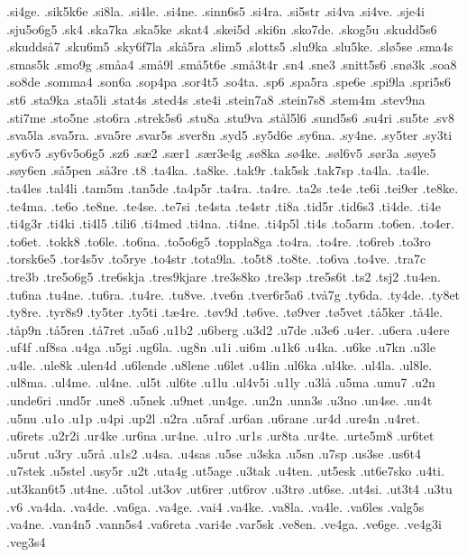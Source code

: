 {.si4ge.
.sik5k6e
.si8la.
.si4le.
.si4ne.
.sinn6s5
.si4ra.
.si5str
.si4va
.si4ve.
.sje4i
.sju5o6g5
.sk4
.ska7ka
.ska5ke
.skat4
.skei5d
.ski6n
.sko7de.
.skog5u
.skudd5s6
.skudds^^e57
.sku6m5
.sky6f7la
.sk^^e55ra
.slim5
.slotts5
.slu9ka
.slu5ke.
.sl^^f85se
.sma4s
.smas5k
.smo9g
.sm^^e5a4
.sm^^e59l
.sm^^e55t6e
.sm^^e53t4r
.sn4
.sne3
.snitt5s6
.sn^^f83k
.soa8
.so8de
.somma4
.son6a
.sop4pa
.sor4t5
.so4ta.
.sp6
.spa5ra
.spe6e
.spi9la
.spri5s6
.st6
.sta9ka
.sta5li
.stat4s
.sted4s
.ste4i
.stein7a8
.stein7s8
.stem4m
.stev9na
.sti7me
.sto5ne
.sto6ra
.strek5s6
.stu8a
.stu9va
.st^^e5l5l6
.sund5s6
.su4ri
.su5te
.sv8
.sva5la
.sva5ra.
.sva5re
.svar5s
.sver8n
.syd5 
.sy5d6e
.sy6na.
.sy4ne.
.sy5ter
.sy3ti
.sy6v5
.sy6v5o6g5
.sz6
.s^^e62
.s^^e6r1
.s^^e6r3e4g
.s^^f88ka
.s^^f84ke.
.s^^f8l6v5
.s^^f8r3a
.s^^f8ye5
.s^^f8y6en
.s^^e55pen
.s^^e53re
.t8
.ta4ka.
.ta8ke.
.tak9r
.tak5sk
.tak7sp
.ta4la.
.ta4le.
.ta4les
.tal4li
.tam5m
.tan5de
.ta4p5r
.ta4ra.
.ta4re.
.ta2s
.te4e
.te6i
.tei9er
.te8ke.
.te4ma.
.te6o
.te8ne.
.te4se.
.te7si
.te4sta
.te4str
.ti8a
.tid5r
.tid6s3
.ti4de.
.ti4e
.ti4g3r
.ti4ki
.ti4l5
.tili6
.ti4med
.ti4na.
.ti4ne.
.ti4p5l
.ti4s
.to5arm
.to6en.
.to4er.
.to6et.
.tokk8
.to6le.
.to6na.
.to5o6g5
.toppla8ga
.to4ra.
.to4re.
.to6reb
.to3ro
.torsk6e5
.tor4s5v
.to5rye
.to4str
.tota9la.
.to5t8
.to8te.
.to6va
.to4ve.
.tra7c
.tre3b
.tre5o6g5
.tre6skja
.tres9kjare
.tre3s8ko
.tre3sp
.tre5s6t
.ts2
.tsj2
.tu4en.
.tu6na
.tu4ne.
.tu6ra.
.tu4re.
.tu8ve.
.tve6n
.tver6r5a6
.tv^^e57g
.ty6da.
.ty4de.
.ty8et
.ty8re.
.tyr8s9
.ty5ter
.ty5ti
.t^^e64re.
.t^^f8v9d
.t^^f86ve.
.t^^f89ver
.t^^f85vet
.t^^e55ker
.t^^e54le.
.t^^e5p9n
.t^^e55ren
.t^^e57ret
.u5a6
.u1b2
.u6berg
.u3d2
.u7de
.u3e6
.u4er.
.u6era
.u4ere
.uf4f
.uf8sa
.u4ga
.u5gi
.ug6la.
.ug8n
.u1i
.ui6m
.u1k6
.u4ka.
.u6ke
.u7kn
.u3le
.u4le.
.ule8k
.ulen4d
.u6lende
.u8lene
.u6let
.u4lin
.ul6ka
.ul4ke.
.ul4la.
.ul8le.
.ul8ma.
.ul4me.
.ul4ne.
.ul5t
.ul6te
.u1lu
.ul4v5i
.u1ly
.u3l^^e5
.u5ma
.umu7
.u2n
.unde6ri
.und5r
.une8
.u5nek
.u9net
.un4ge.
.un2n
.unn3s
.u3no
.un4se.
.un4t
.u5nu
.u1o
.u1p
.u4pi
.up2l
.u2ra
.u5raf
.ur6an
.u6rane
.ur4d
.ure4n
.u4ret.
.u6rets
.u2r2i
.ur4ke
.ur6na
.ur4ne.
.u1ro
.ur1s
.ur8ta
.ur4te.
.urte5m8
.ur6tet
.u5rut
.u3ry
.u5r^^e5
.u1s2
.u4sa.
.u4sas
.u5se
.u3ska
.u5sn
.u7sp
.us3se
.us6t4
.u7stek
.u5stel
.usy5r
.u2t
.uta4g
.ut5age
.u3tak
.u4ten.
.ut5esk
.ut6e7sko
.u4ti.
.ut3kan6t5
.ut4ne.
.u5tol
.ut3ov
.ut6rer
.ut6rov
.u3tr^^f8
.ut6se.
.ut4si.
.ut3t4
.u3tu
.v6
.va4da.
.va4de.
.va6ga.
.va4ge.
.vai4
.va4ke.
.va8la.
.va4le.
.va6les
.valg5s
.va4ne.
.van4n5
.vann5s4
.va6reta
.vari4e
.var5sk
.ve8en.
.ve4ga.
.ve6ge.
.ve4g3i
.veg3s4
}
